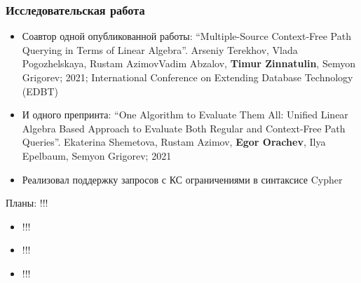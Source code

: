 \documentclass[xcolor=table,aspectratio=169]{beamer}
\begin{document}
            


\begin{frame}[fragile] \frametitle{Исследовательская работа}
  
    \begin{itemize}
        \item Соавтор одной опубликованной работы: ``Multiple-Source Context-Free Path Querying in Terms of Linear Algebra''. Arseniy Terekhov, Vlada Pogozhelskaya, Rustam AzimovVadim Abzalov, \textbf{Timur Zinnatulin}, Semyon Grigorev; 2021; International Conference on Extending Database Technology (EDBT)

        \item И одного препринта: ``One Algorithm to Evaluate Them All: Unified Linear Algebra Based Approach to Evaluate Both Regular and Context-Free Path Queries''. Ekaterina Shemetova, Rustam Azimov, \textbf{Egor Orachev}, Ilya Epelbaum, Semyon Grigorev; 2021
        \item Реализовал поддержку запросов с КС ограничениями в синтаксисе Cypher
    \end{itemize}
  \pause
  \vfill
  Планы: !!!
  \begin{itemize}
        \item !!!
        \item !!!
        \item !!!
  \end{itemize}

\end{frame}
\end{document}
